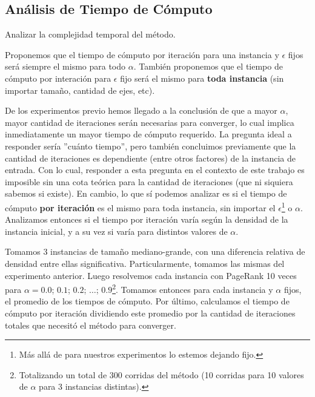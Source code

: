 \subsection{An\'alisis de Tiempo de C\'omputo}
\label{subsec:exp4}
\begin{LaTeXdescription}
    \item[Objetivo] Analizar la complejidad temporal del m\'etodo.\\

    \item[Hip\'otesis] Proponemos que el tiempo de c\'omputo por iteraci\'on
        para una instancia y $\epsilon$ fijos ser\'a siempre el mismo para todo
        $\alpha$. Tambi\'en proponemos que el tiempo de c\'omputo por interación
        para $\epsilon$ fijo ser\'a el mismo para \textbf{toda instancia} (sin
        importar tama\~no, cantidad de ejes, etc).\\

    \item[Proposici\'on] De los experimentos previo hemos llegado a la
        conclusi\'on de que a mayor $\alpha$, mayor cantidad de iteraciones
        ser\'an necesarias para converger, lo cual implica inmediatamente un
        mayor tiempo de c\'omputo requerido. La pregunta ideal a responder
        ser\'ia ''cu\'anto tiempo'', pero tambi\'en concluimos previamente que
        la cantidad de iteraciones es dependiente (entre otros factores) de la
        instancia de entrada. Con lo cual, responder a esta pregunta en el
        contexto de este trabajo es imposible sin una cota te\'orica para la
        cantidad de iteraciones (que ni siquiera sabemos si existe). En cambio,
        lo que s\'i podemos analizar es si el tiempo de c\'omputo \textbf{por
        iteraci\'on} es el mismo para toda instancia, sin importar el
        $\epsilon$\footnote{M\'as all\'a de para nuestros experimentos lo
        estemos dejando fijo.} o $\alpha$. Analizamos entonces si el tiempo por
        iteraci\'on var\'ia seg\'un la densidad de la instancia inicial, y a su
        vez si varía para distintos valores de $\alpha$.\\

    \item[M\'etodo de Experimentaci\'on] Tomamos 3 instancias de tama\~no
        mediano-grande, con una diferencia relativa de densidad entre ellas
        significativa. Particularmente, tomamos las mismas del experimento
        anterior. Luego resolvemos cada instancia con PageRank 10 veces para
        $\alpha=0.0$; $0.1$; $0.2$; $\dots$; $0.9$\footnote{Totalizando un total
        de 300 corridas del m\'etodo (10 corridas para 10 valores de $\alpha$
        para 3 instancias distintas).}. Tomamos entonces para cada instancia y
        $\alpha$ fijos, el promedio de los tiempos de c\'omputo. Por \'ultimo,
        calculamos el tiempo de c\'omputo por iteraci\'on dividiendo este
        promedio por la cantidad de iteraciones totales que necesit\'o el
        m\'etodo para converger.\\

    \item[Resultados, an\'alisis y discusi\'on]
\end{LaTeXdescription}


